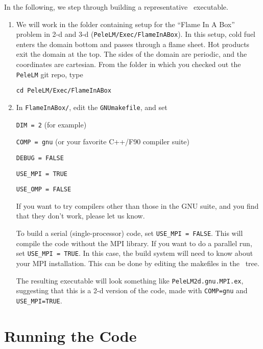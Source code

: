 In the following, we step through building a representative \pelelm\ executable.
\begin{enumerate}
\item We will work in the folder containing setup for the ``Flame In A Box'' problem in 2-d and 3-d
({\tt PeleLM/Exec/FlameInABox}).
In this setup, cold fuel enters the domain bottom and passes through a flame sheet.
Hot products exit the domain at the top.  The sides of the domain are periodic, and the coordinates are
cartesian. From the folder in which you checked out the {\tt PeleLM} git repo,
  type
\begin{verbatim}
cd PeleLM/Exec/FlameInABox
\end{verbatim}

\item In {\tt FlameInABox/}, edit the {\tt GNUmakefile}, and set

{\tt DIM = 2} (for example)

{\tt COMP = gnu} (or your favorite C++/F90 compiler suite)

{\tt DEBUG = FALSE}

{\tt USE\_MPI = TRUE}

{\tt USE\_OMP = FALSE}

If you want to try compilers other than those in the GNU suite, and you find that they don't
work, please let us know.

To build a serial (single-processor) code, set {\tt USE\_MPI = FALSE}.
This will compile the code without the MPI library.  If you want to do
a parallel run, set {\tt USE\_MPI = TRUE}.  In this
case, the build system will need to know about your MPI installation.
This can be done by editing the makefiles in the \amrex\ tree.

The resulting executable will look something like {\tt PeleLM2d.gnu.MPI.ex},
suggesting that this is a 2-d version of the code, made with 
{\tt COMP=gnu} and {\tt USE\_MPI=TRUE}.

\end{enumerate}

\section{Running the Code}

